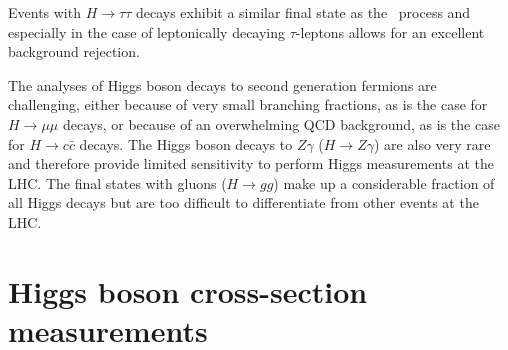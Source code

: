 
Events with $H \to \tau\tau $ decays exhibit a similar final state as the \HWW\ process and especially in the case of leptonically decaying $\tau$-leptons allows for an excellent background rejection. 

The analyses of Higgs boson decays to second generation fermions are challenging, either because of very small branching fractions, as is the case for $H \to \mu\mu$ decays, or because of an overwhelming QCD background, as is the case for $H \to c\bar{c}$ decays.
The Higgs boson decays to $Z\gamma$ ($H \to Z\gamma$) are also very rare and therefore provide limited sensitivity to perform Higgs measurements at the LHC.
The final states with gluons ($H \to gg$) make up a considerable fraction of all Higgs decays but are too difficult to differentiate from other events at the LHC.


\section{Higgs boson cross-section measurements}
\label{subsec:xsec-measurements}

